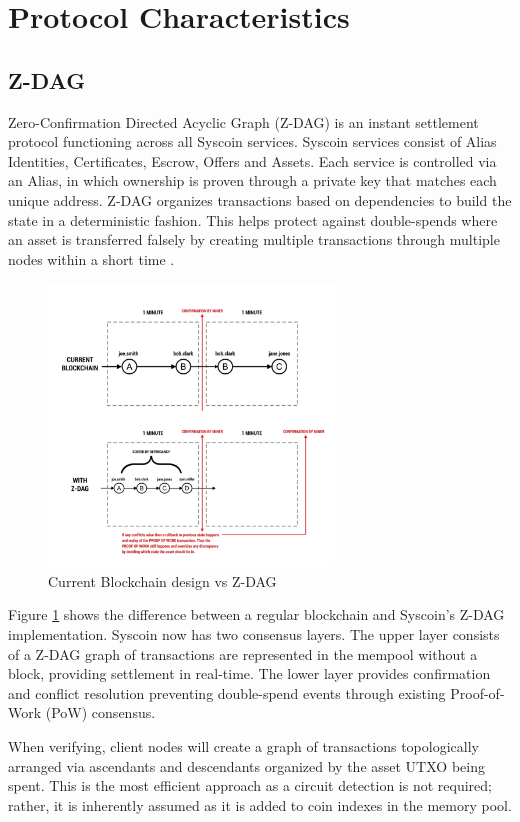 \documentclass[peerreview]{ieeesyscoin}
\begin{document}
\section{Protocol Characteristics}
\label{sec:protocol}

\subsection{Z-DAG}
Zero-Confirmation Directed Acyclic Graph (Z-DAG) is an instant settlement protocol functioning across all Syscoin services. Syscoin services consist of Alias Identities, Certificates, Escrow, Offers and Assets. Each service is controlled via an Alias, in which ownership is proven through a private key that matches each
unique address. Z-DAG organizes transactions based on dependencies to build the state in a deterministic fashion. This helps protect against double-spends where an asset is transferred falsely by creating multiple transactions through multiple nodes within a short time \cite{Sida18}.

\begin{figure}[h!]
\includegraphics[width=3in]{img/current_vs_zdag.png}
\caption{Current Blockchain design vs Z-DAG} 
\label{fig:current_vs_zdag}
\end{figure} 

Figure \ref{fig:current_vs_zdag}  shows the difference between a regular blockchain and Syscoin’s Z-DAG implementation. Syscoin now has two consensus layers. The upper layer consists of a Z-DAG graph of transactions are represented in the mempool without a block, providing settlement in real-time. The lower layer provides confirmation and conflict resolution preventing double-spend events through existing Proof-of-Work (PoW) consensus.

When verifying, client nodes will create a graph of transactions topologically arranged via ascendants and descendants organized by the asset UTXO being spent. This is the most efficient approach as a circuit detection is not required; rather, it is inherently assumed as it is added to coin indexes in the memory pool.
\end{document}
